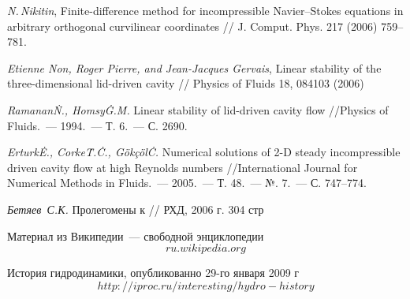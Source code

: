 \begin{thebibliography}{99}

  \textit{N.\,Nikitin}, Finite-difference method for incompressible Navier–Stokes equations in 
  arbitrary orthogonal curvilinear coordinates // J. Comput. Phys. 217 (2006) 759–781.

  \textit{Etienne Non, Roger Pierre, and Jean-Jacques Gervais}, Linear stability of the 
  three-dimensional lid-driven cavity // Physics of Fluids 18, 084103 (2006)
  
   \textit{Ramanan\.N., Homsy\.G.\.M.} Linear stability of lid-driven cavity flow 
  //Physics of Fluids.~--- 1994.~--- Т. 6.~--- С. 2690.
  
   \textit{Erturk\.E., Corke\.T.\.C., Gökçöl\.C.} Numerical solutions of 2-D steady incompressible
  driven cavity flow at high Reynolds numbers //International Journal for Numerical Methods in 
  Fluids.~--- 2005.~--- Т. 48.~--- №. 7.~--- С. 747--774.

	\textit{Бетяев~С.К.} Пролегомены к // РХД, 2006 г. 304 стр
  
		Материал из Википедии~--- свободной энциклопедии \[ru.wikipedia.org\]

		История гидродинамики, опубликованно 29-го января 2009 г \[http://iproc.ru/interesting/hydro-history\]

\end{thebibliography}
